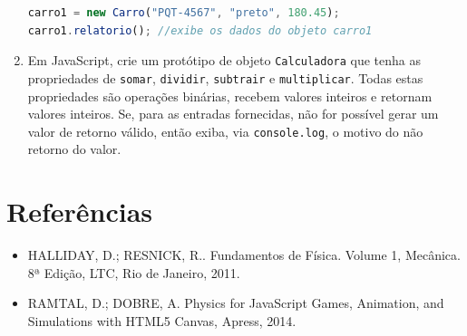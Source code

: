 \documentclass[12pt,a4paper,oneside]{article}
\begin{document}
\begin{enumerate}
\begin{lstlisting}[language=JavaScript]
carro1 = new Carro("PQT-4567", "preto", 180.45);
carro1.relatorio();	//exibe os dados do objeto carro1
\end{lstlisting}
	
	\item Em JavaScript, crie um protótipo de objeto {\tt Calculadora} que tenha as propriedades de {\tt somar}, {\tt dividir}, {\tt subtrair} e {\tt multiplicar}. Todas estas propriedades são operações binárias, recebem valores inteiros e retornam valores inteiros. Se, para as entradas fornecidas, não for possível gerar um valor de retorno válido, então exiba, via {\tt console.log}, o motivo do não retorno do valor.
		
\end{enumerate}

\section{Referências}

\begin{itemize}
	\item HALLIDAY, D.; RESNICK, R.. Fundamentos de Física. Volume 1, Mecânica. 8ª Edição, LTC, Rio de Janeiro, 2011.

	\item RAMTAL, D.; DOBRE, A. Physics for JavaScript Games, Animation, and Simulations with HTML5 Canvas, Apress, 2014.
\end{itemize}
\end{document}
